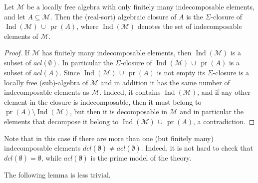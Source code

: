 \documentclass[a4paper,11pt]{article}
\begin{document}
\begin{lemma}\label{algclosurefin}
Let $\mathcal{M}$ be a locally free algebra with only finitely many indecomposable elements, and let $A\subseteq \mathcal{M}$.
Then the (real-sort) algebraic closure of $A$ is the $\Sigma$-closure of
$\operatorname{Ind}(\mathcal{M}) \,\cup\, \operatorname{pr}(A)$,
where $\operatorname{Ind}(\mathcal{M})$ denotes the set of indecomposable elements of $\mathcal{M}$.

\end{lemma}
\begin{proof}
If $\mathcal{M}$ has finitely many indecomposable elements, then $\operatorname{Ind}(\mathcal{M})$ is a subset of $acl(\emptyset)$. In particular the $\Sigma$-closure of $\operatorname{Ind}(\mathcal{M}) \,\cup\, \operatorname{pr}(A)$ is a subset of $acl(A)$. Since $\operatorname{Ind}(\mathcal{M}) \,\cup\, \operatorname{pr}(A)$ is not empty its $\Sigma$-closure is a locally free (sub)-algebra of $\mathcal{M}$ and in addition it has the same number of indecomposable elements as $\mathcal{M}$. Indeed, it contains $\operatorname{Ind}(\mathcal{M})$, and if any other element in the closure is indecomposable, then it must belong to $\operatorname{pr}(A)\setminus \operatorname{Ind}(\mathcal{M})$, but then it is decomposable in $\mathcal{M}$ and in particular the elements that decompose it belong to $\operatorname{Ind}(\mathcal{M}) \,\cup\, \operatorname{pr}(A)$, a contradiction. 

\end{proof}

Note that in this case if there are more than one (but finitely many)  indecomposable elements  $dcl(\emptyset)\neq acl(\emptyset)$. Indeed, it is not hard to check that $dcl(\emptyset)=\emptyset$, while $acl(\emptyset)$ is the prime model of the theory. 

The following lemma is less trivial. 
\end{document}
